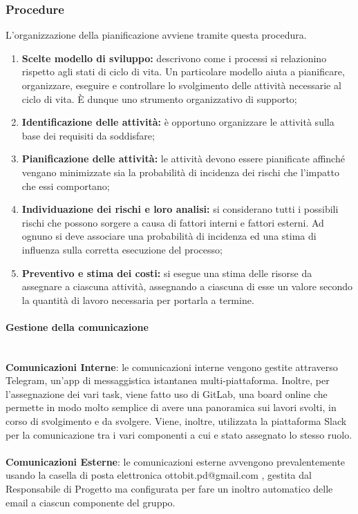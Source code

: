 \documentclass[11pt,a4paper]{article}
\begin{document}
{	\subsubsection{Procedure}
	
	L’organizzazione della pianificazione avviene tramite questa procedura.
	
	\begin{enumerate}
		\item \textbf{Scelte modello di sviluppo:} descrivono come i processi si relazionino rispetto agli stati di ciclo di vita. Un particolare modello aiuta a pianificare, organizzare, eseguire e controllare lo svolgimento delle attività necessarie al ciclo di vita. È dunque uno strumento organizzativo di supporto;
		\item \textbf{Identificazione delle attività:} è opportuno organizzare le attività sulla base dei requisiti da soddisfare;
		\item \textbf{Pianificazione delle attività:} le attività devono essere pianificate affinché vengano minimizzate sia la probabilità di incidenza dei rischi che l'impatto che essi comportano;
		\item \textbf{Individuazione dei rischi e loro analisi:} si considerano tutti i possibili rischi che possono sorgere a causa di fattori interni e fattori esterni. Ad ognuno si deve associare una probabilità di incidenza ed una stima di influenza sulla corretta esecuzione del processo;
		\item \textbf{Preventivo e stima dei costi:} si esegue una stima delle risorse da assegnare a ciascuna attività, assegnando a ciascuna di esse un valore secondo la quantità di lavoro necessaria per portarla a termine.
	\end{enumerate}

\paragraph{Gestione della comunicazione\\}
\noindent\\
\textbf{Comunicazioni Interne}: le comunicazioni interne vengono gestite attraverso Telegram, un'app di messaggistica
istantanea multi-piattaforma. Inoltre, per l'assegnazione dei vari task, viene fatto uso di GitLab, una board online
che permette in modo molto semplice di avere una panoramica sui lavori svolti, in corso di svolgimento e da svolgere.
Viene, inoltre, utilizzata la piattaforma Slack per la comunicazione tra i vari componenti a cui e stato assegnato
lo stesso ruolo.\noindent\\\\
\textbf{Comunicazioni Esterne}: le comunicazioni esterne avvengono prevalentemente usando la casella di posta
elettronica ottobit.pd@gmail.com , gestita dal Responsabile di Progetto ma configurata per fare un inoltro automatico delle email a ciascun componente del gruppo.

}
\end{document}
